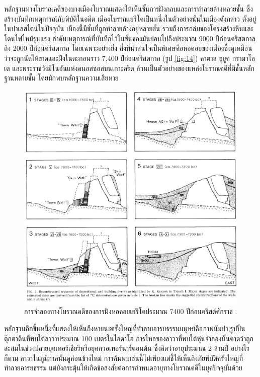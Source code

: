 \documentclass[10pt,twocolumn,letterpaper]{article}
\begin{document}
หลักฐานทางโบราณคดีของบางเมืองโบราณแสดงให้เห็นชั้นการฝังกลบและการทำลายล้างหลายชั้น ซึ่งสร้างบันทึกเหตุการณ์ภัยพิบัติในอดีต เมืองโบราณเยรีโคเป็นหนึ่งในตัวอย่างนั้นในเมืองดังกล่าว ตั้งอยู่ในปาเลสไตน์ในปัจจุบัน เมืองนี้มีชั้นที่ถูกทำลายล้างอยู่หลายชั้น รวมถึงการถล่มของโครงสร้างหินและโดนไฟไหม้รุนแรง \cite{96,97}  ลำดับเหตุการณ์ที่บันทึกไว้ในชั้นของมันย้อนไปถึงประมาณ 9000 ปีก่อนคริสตกาลถึง 2000 ปีก่อนคริสตกาล โดยเฉพาะอย่างยิ่ง สิ่งที่น่าสนใจเป็นพิเศษคือหอคอยของเมืองซึ่งดูเหมือนว่าจะถูกนัดให้ขาดและฝังในตะกอนราว 7,400 ปีก่อนคริสตกาล (รูป \ref{fig:14}) \cite{95} คาตาล ฮูยูค \cite{99} กรามาโลเต \cite{98} และพระราชวังมิโนอันแห่งคนอสซอสบนเกาะครีต \cite{100,101} ล้วนเป็นตัวอย่างของแหล่งโบราณคดีที่มีชั้นหลักฐานหลายชั้น โดยมักพบหลักฐานความเสียหาย

\begin{figure}[t]
\begin{center}

\includegraphics[width=1\linewidth]{jericho.jpg}
\end{center}
   \caption{การจำลองทางโบราณคดีของการฝังหอคอยเยรีโคประมาณ 7400 ปีก่อนคริสต์ศักราช \cite{95}.}
\label{fig:14}
\label{fig:onecol}
\end{figure}

หลักฐานอีกชิ้นหนึ่งที่แสดงให้เห็นถึงหายนะครั้งใหญ่ที่ทำลายอารยธรรมมนุษย์คือภาพนัมปา,รูปปั้นตุ๊กตาดินที่พบใต้ลาวาประมาณ 100 เมตรในไอดาโฮ \cite{102,103} การไหลของลาวาที่พบใต้หุ่นจำลองนั้นคาดว่าถูกสะสมในช่วงปลายยุคเทอร์เชียรีหรือยุคควอเทอร์นารีตอนต้น ซึ่งคิดว่าอายุประมาณ 2 ล้านปี อย่างไรก็ตาม ลาวาในภูมิภาคนั้นดูค่อนข้างใหม่ การค้นพบเช่นนี้ไม่เพียงแต่ชี้ให้เห็นถึงภัยพิบัติครั้งใหญ่ที่ทำลายอารยธรรม แต่ยังกระตุ้นให้เกิดข้อสงสัยต่อการกำหนดอายุทางโบราณคดีในยุคปัจจุบันด้วย
\end{document}
